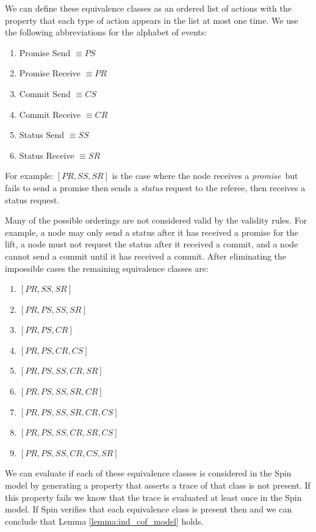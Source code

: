 \documentclass[runningheads]{llncs}
\newcommand{\promise}{\emph{promise}}
\begin{document}
We can define these equivalence classes as an ordered list of actions with the property that each type of action appears in the list at most one time. 
We use the following abbreviations for the alphabet of events: 
\begin{enumerate}
    \item Promise Send $\equiv PS$
    \item Promise Receive $\equiv PR$
    \item Commit Send $\equiv CS$
    \item Commit Receive $\equiv CR$
    \item Status Send $\equiv SS$
    \item Status Receive $\equiv SR$
\end{enumerate}
For example: $[PR, SS, SR]$ is the case where the node receives a \promise\ but fails to send a promise then sends a \emph{status} request to the referee, then receives a status request.

Many of the possible orderings are not considered valid by the validity rules. For example, a node may only send a status after it has received a promise for the lift, a node must not request the status after it received a commit, and a node cannot send a commit until it has received a commit. 
After eliminating the impossible cases the remaining equivalence classes are:
\begin{enumerate}
    \item $[PR, SS, SR]$
    \item $[PR, PS, SS, SR]$
    \item $[PR, PS, CR]$
    \item $[PR, PS, CR, CS]$
    \item $[PR, PS, SS, CR, SR]$
    \item $[PR, PS, SS, SR, CR]$
    \item $[PR, PS, SS, SR, CR, CS]$
    \item $[PR, PS, SS, CR, SR, CS]$
    \item $[PR, PS, SS, CR, CS, SR]$
\end{enumerate}

We can evaluate if each of these equivalence classes is considered in the Spin model by generating a property that asserts a trace of that class is not present. If this property fails we know that the trace is evaluated at least once in the Spin model. If Spin verifies that each equivalence class is present then and we can conclude that Lemma \ref{lemma:ind_cof_model} holds.
\end{document}
